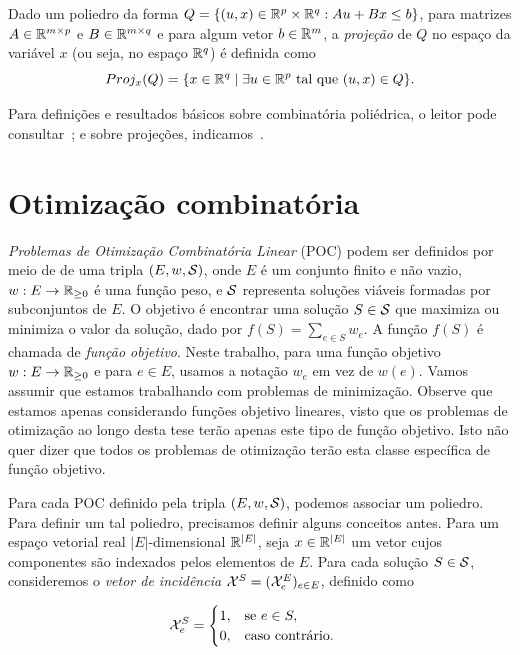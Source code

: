 Dado um poliedro da forma $Q = \{(u,x) \in \mathbb{R}^p \times
  \mathbb{R}^q: Au + Bx \le b\}$, para matrizes $A \in \mathbb{R}^{m \times p}$ e $B \in
  \mathbb{R}^{m \times q}$ e para algum
  vetor $b \in \mathbb{R}^{m}$, a \emph{projeção} de $Q$ no espaço da variável $x$
  (ou seja, no espaço $\mathbb{R}^q$) é definida como 
 $$Proj_x(Q) = \{x \in \mathbb{R}^q\; | \; \exists u \in \mathbb{R}^p \text{
   tal que } (u,x) \in Q \}.$$
 

 Para definições e resultados básicos sobre combinatória poliédrica, o leitor pode consultar~\cite{FerreiraW1996}; e sobre projeções, 
 indicamos~\cite{Balas2005}.


\section{Otimização combinatória}
\label{sec:otimizacao}

\emph{Problemas de Otimização Combinatória Linear} (POC) podem ser definidos
por meio de
de uma tripla $(E, w, \mathcal{S})$, onde
$E$ é um conjunto finito e não vazio, $w: E \to \mathbb{R}_{\ge 0}$ é
uma função peso, e $\mathcal{S}$ representa soluções viáveis formadas por
subconjuntos de $E$. O objetivo é encontrar uma solução $S \in \mathcal{S}$ que
maximiza ou minimiza o valor da solução, dado por $f(S) = \sum_{e \in S} w_e$.
A função $f(S)$ é chamada de \emph{função objetivo}.
Neste trabalho, para uma função objetivo
  $w: E \to \mathbb{R}_{\ge 0}$
  e para $e \in E$, usamos a  notação $w_e$ em vez de $w(e)$.
Vamos assumir que estamos trabalhando com problemas de minimização.
Observe que estamos apenas considerando funções objetivo lineares,
visto que os problemas de otimização ao longo desta tese terão apenas
este tipo de função objetivo. Isto não quer dizer que todos os problemas
de otimização terão esta classe específica de função objetivo.

Para cada POC definido pela tripla $(E, w, \mathcal{S})$, podemos associar um poliedro. Para definir um tal poliedro, precisamos definir alguns conceitos antes. Para um espaço vetorial real $|E|$-dimensional $\mathbb{R}^{|E|}$, seja $x \in \mathbb{R}^{|E|}$ um vetor cujos componentes são indexados pelos elementos de $E$. Para cada solução $S \in \mathcal{S}$, consideremos o \emph{vetor de incidência} $\mathcal{X}^{S} = (\mathcal{X}^{E}_{e})_{e \in E}$, definido como

  \begin{align*}
    &\mathcal{X}^{S}_{e}=
      \begin{cases}
        1,& \text{se $e \in S,$}\\
        0,& \text{caso contrário.}
      \end{cases}
  \end{align*}

